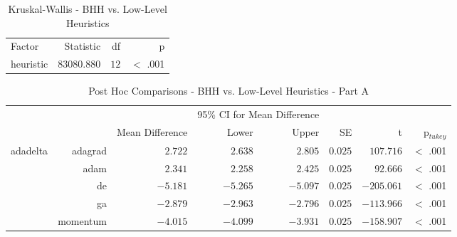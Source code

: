 \begin{table}[H]
	\centering
	\caption{Kruskal-Wallis - BHH vs. Low-Level Heuristics}
	\label{tab:results:standalone:kruskal}%
	\par\bigskip
	\resizebox{0.4\textwidth}{!}
	{
		\begin{tabular}{lrrr}
			\toprule
			Factor    & Statistic   & df   & p        \\
			\cmidrule[0.4pt]{1-4}
			heuristic & $83080.880$ & $12$ & $<$ .001 \\
			\bottomrule
		\end{tabular}
	}
\end{table}

\begin{table}[H]
	\centering
	\caption{Post Hoc Comparisons - BHH vs. Low-Level Heuristics - Part A}
	\label{tab:results:standalone:post_hoc_part_a}%
	\par\bigskip
	\resizebox{\textwidth}{!}
	{
		\begin{tabular}{lrrrrrrr}
			\toprule
			\multicolumn{1}{c}{} & \multicolumn{1}{c}{} & \multicolumn{1}{c}{} & \multicolumn{2}{c}{95\% CI for Mean Difference} & \multicolumn{1}{c}{} & \multicolumn{1}{c}{} & \multicolumn{1}{c}{}               \\
			\cline{4-5}
			$ $                  & $ $                  & Mean Difference      & Lower                                           & Upper                & SE                   & t                    & p$_{tukey}$ \\
			\cmidrule[0.4pt]{1-8}
			adadelta             & adagrad              & $2.722$              & $2.638$                                         & $2.805$              & $0.025$              & $107.716$            & $<$ .001    \\
			$ $                  & adam                 & $2.341$              & $2.258$                                         & $2.425$              & $0.025$              & $92.666$             & $<$ .001    \\
			                     & de                   & $-5.181$             & $-5.265$                                        & $-5.097$             & $0.025$              & $-205.061$           & $<$ .001    \\
			                     & ga                   & $-2.879$             & $-2.963$                                        & $-2.796$             & $0.025$              & $-113.966$           & $<$ .001    \\
			                     & momentum             & $-4.015$             & $-4.099$                                        & $-3.931$             & $0.025$              & $-158.907$           & $<$ .001    \\

\end{tabular}}
\end{table}
